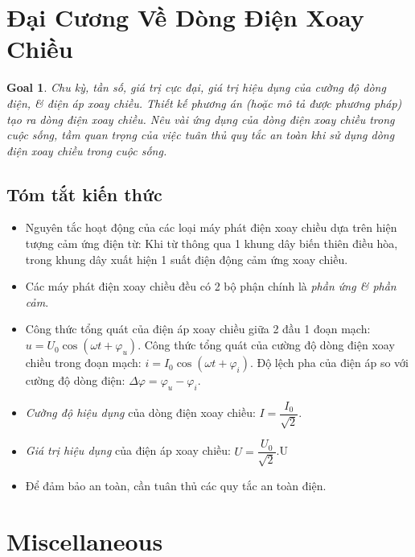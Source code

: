 \documentclass{article}
\newtheorem{goal}{Goal}
\begin{document}

\section{Đại Cương Về Dòng Điện Xoay Chiều}

\begin{goal}
	Chu kỳ, tần số, giá trị cực đại, giá trị hiệu dụng của cường độ dòng điện, \& điện áp xoay chiều. Thiết kế phương án (hoặc mô tả được phương pháp) tạo ra dòng điện xoay chiều. Nêu vài ứng dụng của dòng điện xoay chiều trong cuộc sống, tầm quan trọng của việc tuân thủ quy tắc an toàn khi sử dụng dòng điện xoay chiều trong cuộc sống.
\end{goal}

\subsection{Tóm tắt kiến thức}

\begin{itemize}
	\item Nguyên tắc hoạt động của các loại máy phát điện xoay chiều dựa trên hiện tượng cảm ứng điện từ: Khi từ thông qua 1 khung dây biến thiên điều hòa, trong khung dây xuất hiện 1 suất điện động cảm ứng xoay chiều.
	\item Các máy phát điện xoay chiều đều có 2 bộ phận chính là {\it phần ứng \& phần cảm}.
	\item Công thức tổng quát của điện áp xoay chiều giữa 2 đầu 1 đoạn mạch: $u = U_0\cos(\omega t + \varphi_u)$. Công thức tổng quát của cường độ dòng điện xoay chiều trong đoạn mạch: $i = I_0\cos(\omega t + \varphi_i)$. Độ lệch pha của điện áp so với cường độ dòng điện: $\Delta\varphi = \varphi_u - \varphi_i$.
	\item {\it Cường độ hiệu dụng} của dòng điện xoay chiều: $I = \dfrac{I_0}{\sqrt{2}}$.
	\item {\it Giá trị hiệu dụng} của điện áp xoay chiều: $U = \dfrac{U_0}{\sqrt{2}}$.U
	\item Để đảm bảo an toàn, cần tuân thủ các quy tắc an toàn điện.
\end{itemize}


\section{Miscellaneous}


\printbibliography[heading=bibintoc]
	
\end{document}
